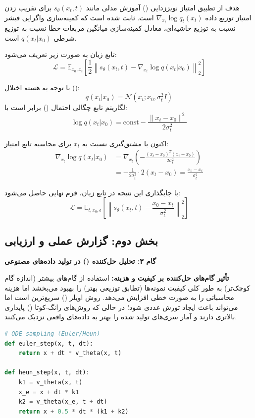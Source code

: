 \begin{solutionbox}
    هدف از تطبیق امتیاز نویززدایی () آموزش مدلی مانند $s_\theta(x_t, t)$ برای تقریب زدن امتیاز توزیع داده $\nabla_{x_t} \log q_t(x_t)$ است. ثابت شده است که کمینه‌سازی واگرایی فیشر نسبت به توزیع حاشیه‌ای، معادل کمینه‌سازی میانگین مربعات خطا نسبت به توزیع شرطی $q(x_t|x_0)$ است.

    
    
    تابع زیان به صورت زیر تعریف می‌شود:
    \[ \mathcal{L} = \mathbb{E}_{x_0, x_t} \left[ \frac{1}{2} \left\| s_\theta(x_t, t) - \nabla_{x_t} \log q(x_t | x_0) \right\|^2_2 \right] \]
    
    با توجه به هسته اختلال ():
    \[ q(x_t | x_0) = \mathcal{N}(x_t; x_0, \sigma_t^2 I) \]
    لگاریتم تابع چگالی احتمال () برابر است با:
    \[ \log q(x_t | x_0) = \text{const} - \frac{\|x_t - x_0\|^2}{2\sigma_t^2} \]
    
    اکنون با مشتق‌گیری نسبت به $x_t$ برای محاسبه تابع امتیاز:
    \begin{align*}
        \nabla_{x_t} \log q(x_t | x_0) &= \nabla_{x_t} \left( - \frac{(x_t - x_0)^T (x_t - x_0)}{2\sigma_t^2} \right) \\
        &= - \frac{1}{2\sigma_t^2} \cdot 2(x_t - x_0) = \frac{x_0 - x_t}{\sigma_t^2}
    \end{align*}
    
    با جایگذاری این نتیجه در تابع زیان، فرم نهایی حاصل می‌شود:
    \[ \mathcal{L} = \mathbb{E}_{t, x_0, \epsilon} \left[ \left\| s_\theta(x_t, t) - \frac{x_0 - x_t}{\sigma_t^2} \right\|^2_2 \right] \]
\end{solutionbox}

\newpage

\subsection{بخش دوم: گزارش عملی و ارزیابی}

\textbf{گام ۳: تحلیل حل‌کننده () در تولید داده‌های مصنوعی}
\begin{solutionbox}
    \textbf{تأثیر گام‌های حل‌کننده بر کیفیت و هزینه:}
    استفاده از گام‌های بیشتر (اندازه گام کوچک‌تر) به طور کلی کیفیت نمونه‌ها (تطابق توزیعی بهتر) را بهبود می‌بخشد اما هزینه محاسباتی را به صورت خطی افزایش می‌دهد. روش اویلر () سریع‌ترین است اما می‌تواند باعث ایجاد تورش عددی شود؛ در حالی که روش‌های رانگ-کوتا () پایداری بالاتری دارند و آمار سری‌های تولید شده را بهتر به داده‌های واقعی نزدیک می‌کنند.



\begin{latin}
\begin{lstlisting}[language=Python]
# ODE sampling (Euler/Heun)
def euler_step(x, t, dt):
    return x + dt * v_theta(x, t)

def heun_step(x, t, dt):
    k1 = v_theta(x, t)
    x_e = x + dt * k1
    k2 = v_theta(x_e, t + dt)
    return x + 0.5 * dt * (k1 + k2)
\end{lstlisting}
\end{latin}
\end{solutionbox}

